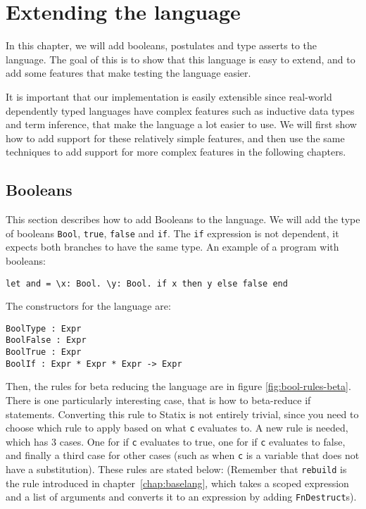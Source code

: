 \chapter{\label{chap:bools}Extending the language}

In this chapter, we will add booleans, postulates and type asserts to the language. The goal of this is to show that this language is easy to extend, and to add some features that make testing the language easier. 

It is important that our implementation is easily extensible since real-world dependently typed languages have complex features such as inductive data types and term inference, that make the language a lot easier to use. We will first show how to add support for these relatively simple features, and then use the same techniques to add support for more complex features in the following chapters.

\section{Booleans}

This section describes how to add Booleans to the language. We will add the type of booleans \verb|Bool|, \verb|true|, \verb|false| and \verb|if|. The \verb|if| expression is not dependent, it expects both branches to have the same type. An example of a program with booleans: 

\begin{lstlisting}
let and = \x: Bool. \y: Bool. if x then y else false end
\end{lstlisting}
The constructors for the language are:

\begin{lstlisting}
BoolType : Expr
BoolFalse : Expr
BoolTrue : Expr
BoolIf : Expr * Expr * Expr -> Expr
\end{lstlisting}
Then, the rules for beta reducing the language are in figure \ref{fig:bool-rules-beta}. There is one particularly interesting case, that is how to beta-reduce if statements. Converting this rule to Statix is not entirely trivial, since you need to choose which rule to apply based on what \verb|c| evaluates to. A new rule is needed, which has 3 cases. One for if \verb|c| evaluates to true, one for if \verb|c| evaluates to false, and finally a third case for other cases (such as when \verb|c| is a variable that does not have a substitution). These rules are stated below: (Remember that \verb|rebuild| is the rule introduced in chapter~\ref{chap:baselang}, which takes a scoped expression and a list of arguments and converts it to an expression by adding \verb|FnDestruct|s).

